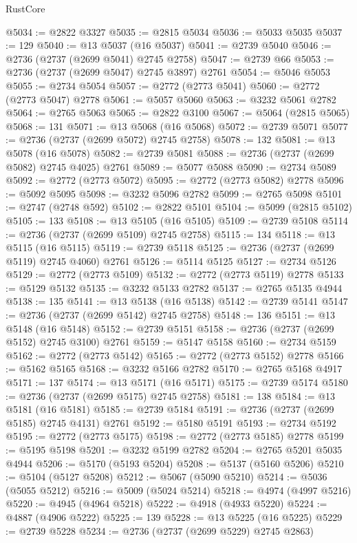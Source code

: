\begin{lexlean}{RustCore}
\begin{coremodule}
@5034 := @2822 @3327
@5035 := @2815 @5034
@5036 := @5033 @5035
@5037 := 129
@5040 := @13 @5037 (@16 @5037)
@5041 := @2739 @5040
@5046 := @2736 (@2737 (@2699 @5041) @2745 @2758)
@5047 := @2739 @66
@5053 := @2736 (@2737 (@2699 @5047) @2745 @3897) @2761
@5054 := @5046 @5053
@5055 := @2734 @5054
@5057 := @2772 (@2773 @5041)
@5060 := @2772 (@2773 @5047) @2778
@5061 := @5057 @5060
@5063 := @3232 @5061 @2782
@5064 := @2765 @5063
@5065 := @2822 @3100
@5067 := @5064 (@2815 @5065)
@5068 := 131
@5071 := @13 @5068 (@16 @5068)
@5072 := @2739 @5071
@5077 := @2736 (@2737 (@2699 @5072) @2745 @2758)
@5078 := 132
@5081 := @13 @5078 (@16 @5078)
@5082 := @2739 @5081
@5088 := @2736 (@2737 (@2699 @5082) @2745 @4025) @2761
@5089 := @5077 @5088
@5090 := @2734 @5089
@5092 := @2772 (@2773 @5072)
@5095 := @2772 (@2773 @5082) @2778
@5096 := @5092 @5095
@5098 := @3232 @5096 @2782
@5099 := @2765 @5098
@5101 := @2747 (@2748 @592)
@5102 := @2822 @5101
@5104 := @5099 (@2815 @5102)
@5105 := 133
@5108 := @13 @5105 (@16 @5105)
@5109 := @2739 @5108
@5114 := @2736 (@2737 (@2699 @5109) @2745 @2758)
@5115 := 134
@5118 := @13 @5115 (@16 @5115)
@5119 := @2739 @5118
@5125 := @2736 (@2737 (@2699 @5119) @2745 @4060) @2761
@5126 := @5114 @5125
@5127 := @2734 @5126
@5129 := @2772 (@2773 @5109)
@5132 := @2772 (@2773 @5119) @2778
@5133 := @5129 @5132
@5135 := @3232 @5133 @2782
@5137 := @2765 @5135 @4944
@5138 := 135
@5141 := @13 @5138 (@16 @5138)
@5142 := @2739 @5141
@5147 := @2736 (@2737 (@2699 @5142) @2745 @2758)
@5148 := 136
@5151 := @13 @5148 (@16 @5148)
@5152 := @2739 @5151
@5158 := @2736 (@2737 (@2699 @5152) @2745 @3100) @2761
@5159 := @5147 @5158
@5160 := @2734 @5159
@5162 := @2772 (@2773 @5142)
@5165 := @2772 (@2773 @5152) @2778
@5166 := @5162 @5165
@5168 := @3232 @5166 @2782
@5170 := @2765 @5168 @4917
@5171 := 137
@5174 := @13 @5171 (@16 @5171)
@5175 := @2739 @5174
@5180 := @2736 (@2737 (@2699 @5175) @2745 @2758)
@5181 := 138
@5184 := @13 @5181 (@16 @5181)
@5185 := @2739 @5184
@5191 := @2736 (@2737 (@2699 @5185) @2745 @4131) @2761
@5192 := @5180 @5191
@5193 := @2734 @5192
@5195 := @2772 (@2773 @5175)
@5198 := @2772 (@2773 @5185) @2778
@5199 := @5195 @5198
@5201 := @3232 @5199 @2782
@5204 := @2765 @5201 @5035 @4944
@5206 := @5170 (@5193 @5204)
@5208 := @5137 (@5160 @5206)
@5210 := @5104 (@5127 @5208)
@5212 := @5067 (@5090 @5210)
@5214 := @5036 (@5055 @5212)
@5216 := @5009 (@5024 @5214)
@5218 := @4974 (@4997 @5216)
@5220 := @4945 (@4964 @5218)
@5222 := @4918 (@4933 @5220)
@5224 := @4887 (@4906 @5222)
@5225 := 139
@5228 := @13 @5225 (@16 @5225)
@5229 := @2739 @5228
@5234 := @2736 (@2737 (@2699 @5229) @2745 @2863)

\end{coremodule}
\end{lexlean}
